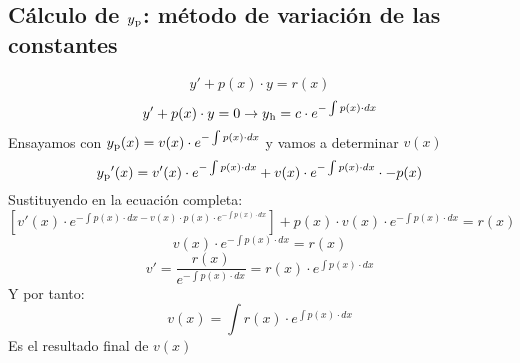 \documentclass{article}
\begin{document}
\subsection{Cálculo de $y\textsubscript{p}$: método de variación de las constantes}
\[y'+p(x)\cdot y=r(x)\]
\[y'+p(x)\cdot y=0 \rightarrow y\textsubscript{h}=c\cdot e^{-\int p(x)\cdot dx}\]
Ensayamos con $y\textsubscript{p}(x)=v(x)\cdot e^{-\int p(x)\cdot dx}$ y vamos a determinar $v(x)$
\[y\textsubscript{p}'(x) = v'(x)\cdot e^{-\int p(x)\cdot dx}+v(x) \cdot e^{-\int p(x)\cdot dx} \cdot -p(x)\]
Sustituyendo en la ecuación completa:
\[ [v'(x)\cdot e^{-\int p(x)\cdot dx- v(x)\cdot p(x) \cdot e^{-\int p(x)\cdot dx}}]+p(x)\cdot v(x)\cdot e^{-\int p(x)\cdot dx}=r(x)\]
\[v(x)\cdot e^{-\int p(x)\cdot dx}=r(x)\]
\[v'=\frac{r(x)}{ e^{-\int p(x)\cdot dx}}=r(x)\cdot e^{\int p(x)\cdot dx}\]
Y por tanto:
\[v(x)=\int r(x)\cdot e^{\int p(x)\cdot dx}\]
Es el resultado final de $v(x)$
\end{document}
